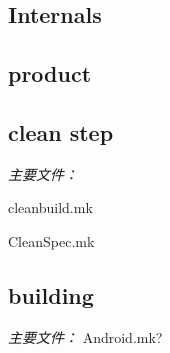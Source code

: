 \documentclass[a4paper,11pt]{article}
\begin{document}
\begin{CJK*}{UTF8}{gbsn}
\section{Internals}
    \subsection{product}
    \subsection{clean step}
    \emph{主要文件：}
    \begin{description}
        \item cleanbuild.mk
        \item CleanSpec.mk
    \end{description}
    \subsection{building}
    \emph{主要文件：}
        Android.mk?




\end{CJK*} %
\end{document}
